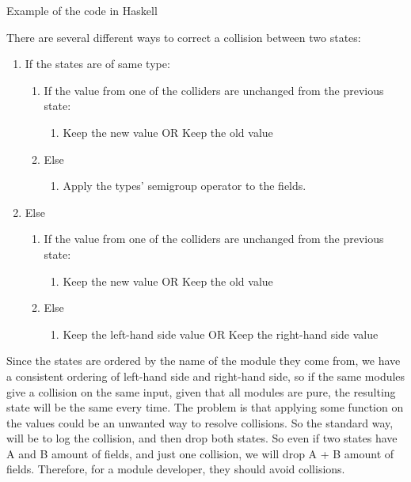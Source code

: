 Example of the code in Haskell

\begin{center}
  
\end{center}

There are several different ways to correct a collision between two
states:

\begin{enumerate}
  \item If the states are of same type:
    \begin{enumerate}
      \item If the value from one of the colliders are unchanged from the previous state:
        \begin{enumerate}
          \item Keep the new value OR Keep the old value
        \end{enumerate}
      \item Else
        \begin{enumerate}
          \item Apply the types' semigroup operator to the fields.
        \end{enumerate}
    \end{enumerate}
  \item Else
    \begin{enumerate}
      \item If the value from one of the colliders are unchanged from the previous state:
        \begin{enumerate}
          \item Keep the new value OR Keep the old value
        \end{enumerate}
      \item Else
        \begin{enumerate}
          \item Keep the left-hand side value OR Keep the right-hand side value
        \end{enumerate}
    \end{enumerate}
\end{enumerate}

Since the states are ordered by the name of the module they come from, we
have a consistent ordering of left-hand side and right-hand side, so if the same
modules give a collision on the same input, given that all modules are pure, the
resulting state will be the same every time. The problem is that applying some
function on the values could be an unwanted way to resolve collisions. So the
standard way, will be to log the collision, and then drop both states. So even
if two states have A and B amount of fields, and just one collision, we will
drop A + B amount of fields. Therefore, for a module developer, they should avoid
collisions.

